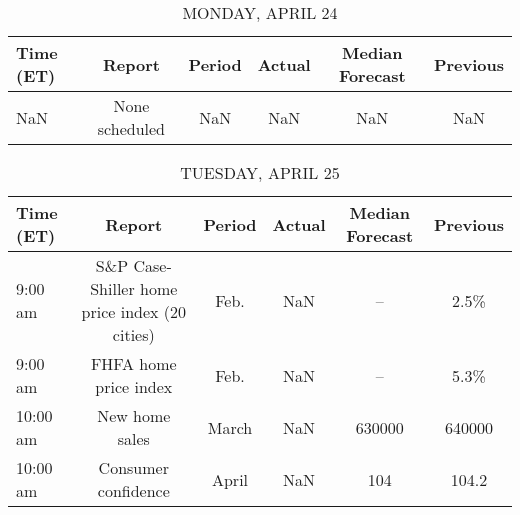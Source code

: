 \documentclass{article}%
\begin{document}
%
\normalsize%


\begin{table}[htbp]%
\caption{MONDAY, APRIL 24}%
\centering%
\begin{adjustbox}{width=1\textwidth}%
\begin{tabular}{lccccc}
\toprule
Time (ET) &         Report & Period & Actual & Median Forecast & Previous \\
\midrule
      NaN & None scheduled &    NaN &    NaN &             NaN &      NaN \\
\bottomrule
\end{tabular}
%
\end{adjustbox}%
\end{table}

%


\begin{table}[htbp]%
\caption{TUESDAY, APRIL 25}%
\centering%
\begin{adjustbox}{width=1\textwidth}%
\begin{tabular}{lccccc}
\toprule
Time (ET) &                                        Report & Period & Actual & Median Forecast & Previous \\
\midrule
  9:00 am & S\&P Case-Shiller home price index (20 cities) &   Feb. &    NaN &              -- &     2.5\% \\
  9:00 am &                         FHFA home price index &   Feb. &    NaN &              -- &     5.3\% \\
 10:00 am &                                New home sales &  March &    NaN &          630000 &   640000 \\
 10:00 am &                           Consumer confidence &  April &    NaN &             104 &    104.2 \\
\bottomrule
\end{tabular}
%
\end{adjustbox}%
\end{table}

%
\end{document}
